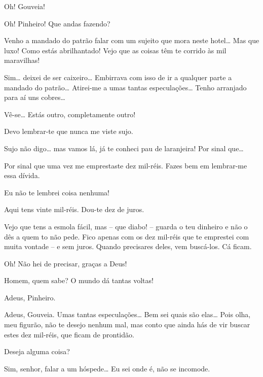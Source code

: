 
  Oh! Gouveia!

 Oh! Pinheiro! Que andas fazendo?

 Venho a mandado do patrão falar com um sujeito que mora neste
hotel\ldots{} Mas que luxo! Como estás abrilhantado! Vejo que as coisas têm te
corrido às mil maravilhas!

  Sim\ldots{} deixei de ser caixeiro\ldots{} Embirrava com isso
de ir a qualquer parte a mandado do patrão\ldots{} Atirei-me a umas tantas
especulações\ldots{} Tenho arranjado para aí uns cobres\ldots{}

 Vê-se\ldots{} Estás outro, completamente outro!

 Devo lembrar-te que nunca me viste sujo.

 Sujo não digo\ldots{} mas vamos lá, já te conheci pau de laranjeira!
Por sinal que\ldots{}

 Por sinal que uma vez me emprestaste dez mil-réis. Fazes bem em
lembrar-me essa dívida.

 Eu não te lembrei coisa nenhuma!

 Aqui tens vinte mil-réis. Dou-te dez de juros.

 Vejo que tens a esmola fácil, mas -- que diabo! -- guarda o teu
dinheiro e não o dês a quem to não pede. Fico apenas com os dez mil-réis que te
emprestei com muita vontade -- e sem juros. Quando precisares deles, vem buscá-los. Cá
ficam.

 Oh! Não hei de precisar, graças a Deus!

 Homem, quem sabe? O mundo dá tantas voltas!

 Adeus, Pinheiro. 

 Adeus, Gouveia.  Umas tantas especulações\ldots{} Bem sei quais
são elas\ldots{} Pois olha, meu figurão, não te desejo nenhum mal, mas conto que
ainda hás de vir buscar estes dez mil-réis, que ficam de prontidão.

  Deseja alguma coisa?

 Sim, senhor, falar a um hóspede\ldots{} Eu sei onde é, não se
incomode. 

